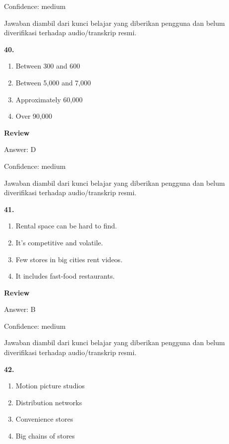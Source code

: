 \documentclass[12pt]{article}
\begin{document}
Confidence: medium\par
Jawaban diambil dari kunci belajar yang diberikan pengguna dan belum diverifikasi terhadap audio/transkrip resmi.\par
\endgroup
\par
\vspace{0.25\baselineskip}
\noindent\textbf{40.}
\begin{enumerate}[label=(\Alph*),leftmargin=*,itemsep=0.2em]
\item Between 300 and 600
\item Between 5,000 and 7,000
\item Approximately 60,000
\item Over 90,000
\end{enumerate}
\par
\begingroup
\setlength{\parskip}{0pt}
\setlength{\parindent}{0pt}
\textbf{Review}\par
Answer: D\par
Confidence: medium\par
Jawaban diambil dari kunci belajar yang diberikan pengguna dan belum diverifikasi terhadap audio/transkrip resmi.\par
\endgroup
\par
\vspace{0.25\baselineskip}
\noindent\textbf{41.}
\begin{enumerate}[label=(\Alph*),leftmargin=*,itemsep=0.2em]
\item Rental space can be hard to find.
\item It's competitive and volatile.
\item Few stores in big cities rent videos.
\item It includes fast-food restaurants.
\end{enumerate}
\par
\begingroup
\setlength{\parskip}{0pt}
\setlength{\parindent}{0pt}
\textbf{Review}\par
Answer: B\par
Confidence: medium\par
Jawaban diambil dari kunci belajar yang diberikan pengguna dan belum diverifikasi terhadap audio/transkrip resmi.\par
\endgroup
\par
\vspace{0.25\baselineskip}
\noindent\textbf{42.}
\begin{enumerate}[label=(\Alph*),leftmargin=*,itemsep=0.2em]
\item Motion picture studios
\item Distribution networks
\item Convenience stores
\item Big chains of stores
\end{enumerate}
\end{document}
